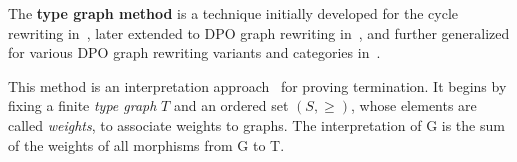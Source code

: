 

The \textbf{type graph method} is a technique initially developed for the cycle rewriting in~\cite{zantema2014termination}, later extended to DPO graph rewriting in~\cite{bruggink2014termination, bruggink2015proving}, and further generalized for various DPO graph rewriting variants and categories in~\cite{endrullis2023generalized}.

This method is an interpretation approach~\cite[see][]{nipkow1998term} for proving termination. It begins by fixing a finite \emph{type graph} \(T\) and an ordered set \((S, \geq)\), whose elements are called \emph{weights}, to associate weights to graphs. The interpretation of G is the sum of the weights of all morphisms from G to T.


